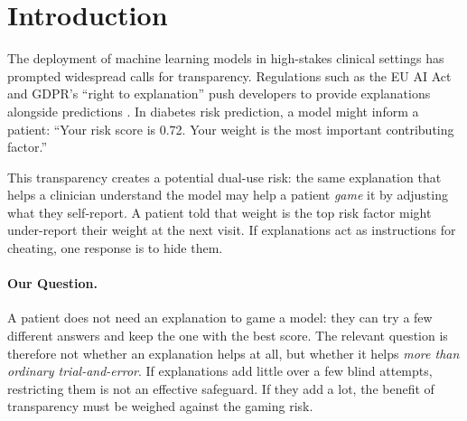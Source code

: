 \documentclass[sigconf,nonacm]{acmart}
\begin{document}


\maketitle

\section{Introduction}

The deployment of machine learning models in high-stakes clinical
settings has prompted widespread calls for transparency.  Regulations
such as the EU AI Act and GDPR's ``right to explanation'' push
developers to provide explanations alongside predictions
\cite{goodman2017european}.  In diabetes risk prediction, a model
might inform a patient: ``Your risk score is 0.72. Your weight is the
most important contributing factor.''

This transparency creates a potential dual-use risk: the same
explanation that helps a clinician understand the model may help a
patient \emph{game} it by adjusting what they self-report.  A patient
told that weight is the top risk factor might under-report their weight
at the next visit.  If explanations act as instructions for cheating,
one response is to hide them.

\paragraph{Our Question.}
A patient does not need an explanation to game a model: they can try
a few different answers and keep the one with the best score.  The
relevant question is therefore not whether an explanation helps at
all, but whether it helps \emph{more than ordinary trial-and-error}.
If explanations add little over a few blind attempts, restricting them
is not an effective safeguard.  If they add a lot, the benefit of
transparency must be weighed against the gaming risk.
\end{document}

